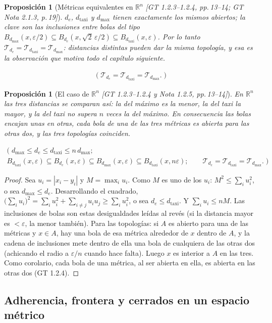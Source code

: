 \documentclass[11pt,a4paper]{article}
\newcommand{\lgc}[1]{\par\vspace{-3pt}\begin{gather*}\big(\;#1\;\big)\end{gather*}\vspace{-6pt}}
\theoremstyle{definition}
\theoremstyle{plain}
\newtheorem{proposicion}[definicion]{Proposición}
\newcommand{\fnt}[1]{{\normalfont\small\itshape\color{gray!150!black}[#1]}}
\newcommand{\R}{\mathbb{R}}
\newcommand{\tp}{\mathcal{T}}
\begin{document}
\begin{proposicion}[Métricas equivalentes en $\R^n$ \fnt{GT 1.2.3--1.2.4, pp.\,13--14; GT Nota 2.1.3, p.\,19}]\label{pr:equiv}
$d_e$, $d_{\text{taxi}}$ y $d_{\max}$ tienen exactamente los mismos abiertos; la clave son las inclusiones entre bolas del tipo
$B_{d_{\max}}(x,\varepsilon/2)\subseteq B_{d_e}(x,\sqrt2\,\varepsilon/2)\subseteq B_{d_{\text{taxi}}}(x,\varepsilon)$. Por lo tanto $\tp_{d_e}=\tp_{d_{\text{taxi}}}=\tp_{d_{\max}}$: distancias distintas pueden dar la misma topología, y esa es la observación que motiva todo el capítulo siguiente.
\lgc{\tp_{d_e}=\tp_{d_{\text{taxi}}}=\tp_{d_{\max}}.}
\end{proposicion}

\begin{proposicion}[El caso de $\R^n$ \fnt{GT 1.2.3--1.2.4 y Nota 1.2.5, pp.\,13--14}]\label{hu:equivRn}
En $\R^n$ las tres distancias se comparan así: la del máximo es la menor, la del taxi la mayor, y la del taxi no supera $n$ veces la del máximo. En consecuencia las bolas encajan unas en otras, cada bola de una de las tres métricas es abierta para las otras dos, y las tres topologías coinciden.
\lgc{d_{\max}\le d_e\le d_{\text{taxi}}\le n\,d_{\max};\\
B_{d_{\text{taxi}}}(x,\varepsilon)\subseteq B_{d_e}(x,\varepsilon)\subseteq B_{d_{\max}}(x,\varepsilon)\subseteq B_{d_{\text{taxi}}}(x,n\varepsilon);\qquad
\tp_{d_e}=\tp_{d_{\text{taxi}}}=\tp_{d_{\max}}.}
\end{proposicion}

\begin{proof}
Sea $u_i=|x_i-y_i|$ y $M=\max_i u_i$. Como $M$ es uno de los $u_i$: $M^2\le\sum_iu_i^2$, o sea $d_{\max}\le d_e$. Desarrollando el cuadrado, $\big(\sum_iu_i\big)^2=\sum_iu_i^2+\sum_{i\ne j}u_iu_j\ge\sum_iu_i^2$, o sea $d_e\le d_{\text{taxi}}$. Y $\sum_iu_i\le nM$. Las inclusiones de bolas son estas desigualdades leídas al revés (si la distancia mayor es $<\varepsilon$, la menor también). Para las topologías: si $A$ es abierto para una de las métricas y $x\in A$, hay una bola de esa métrica alrededor de $x$ dentro de $A$, y la cadena de inclusiones mete dentro de ella una bola de cualquiera de las otras dos (achicando el radio a $\varepsilon/n$ cuando hace falta). Luego $x$ es interior a $A$ en las tres. Como corolario, cada bola de una métrica, al ser abierta en ella, es abierta en las otras dos (GT 1.2.4).
\end{proof}

\subsection{Adherencia, frontera y cerrados en un espacio métrico}
\end{document}
